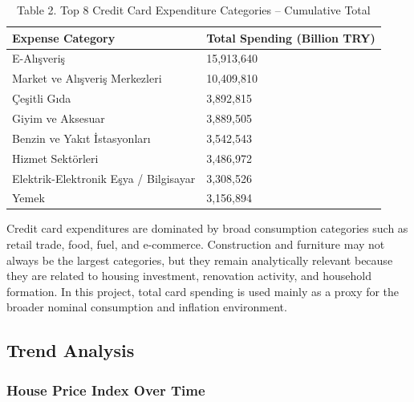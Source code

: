 \documentclass[
  11pt,
  a4paper,
]{article}
\begin{document}
\begin{longtable}[t]{ll}
\caption{\label{tab:eda-credit-top}Table 2. Top 8 Credit Card Expenditure Categories – Cumulative Total}\\
\toprule
Expense Category & Total Spending (Billion TRY)\\
\midrule
E-Alışveriş & 15,913,640\\
Market ve Alışveriş Merkezleri & 10,409,810\\
Çeşitli Gıda & 3,892,815\\
Giyim ve Aksesuar & 3,889,505\\
Benzin ve Yakıt İstasyonları & 3,542,543\\
\addlinespace
Hizmet Sektörleri & 3,486,972\\
Elektrik-Elektronik Eşya / Bilgisayar & 3,308,526\\
Yemek & 3,156,894\\
\bottomrule
\end{longtable}

Credit card expenditures are dominated by broad consumption categories
such as retail trade, food, fuel, and e-commerce. Construction and
furniture may not always be the largest categories, but they remain
analytically relevant because they are related to housing investment,
renovation activity, and household formation. In this project, total
card spending is used mainly as a proxy for the broader nominal
consumption and inflation environment.

\subsection{Trend Analysis}\label{trend-analysis}

\subsubsection{House Price Index Over
Time}\label{house-price-index-over-time}
\end{document}
